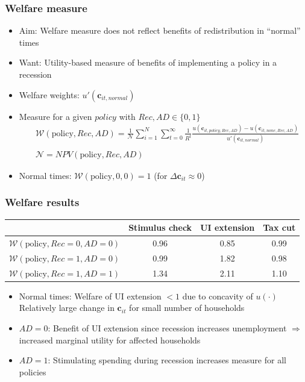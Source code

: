 \documentclass[pdflatex,aspectratio=169, handout]{beamer}
\begin{document}
\begin{frame}
\frametitle{Welfare measure}
\begin{itemize}[<+->]
\item Aim: Welfare measure does not reflect benefits of redistribution in ``normal'' times
\item Want: Utility-based measure of benefits of implementing a policy in a recession
\item Welfare weights: $u'(\mathbf{c}_{it,\textit{normal}})$
\item Measure for a given $policy$ with $Rec,AD\in\{0,1\}$
\begin{align*}
& \mathcal{W}(\text{policy},Rec,AD) =\frac{1}{\mathcal{N}} \sum_{i=1}^{N} \sum_{t=0}^{\infty} \frac{1}{R^t} \frac{u(\mathbf{c}_{it,\textit{policy},Rec,AD}) - u(\mathbf{c}_{it,\textit{none},Rec,AD})}{ u'(\mathbf{c}_{it,\textit{normal}})} \\ \\ 
& \mathcal{N} = NPV(\text{policy},Rec,AD)
\end{align*}
\item Normal times: $\mathcal{W}(\text{policy},0,0) = 1$ (for $\Delta \mathbf{c}_{it}\approx 0$)
\end{itemize}
\end{frame}

\begin{frame}
	\frametitle{Welfare results}
	\centering 
	\begin{tabular}{@{}lccc@{}} 
		\toprule 
		& Stimulus check      & UI extension    & Tax cut    \\  \midrule 
		$\mathcal{W}(\text{policy}, Rec=0, AD=0)$ & 0.96  & 0.85  & 0.99     \\ 
		$\mathcal{W}(\text{policy}, Rec=1, AD=0)$ & 0.99  & 1.82  & 0.98     \\ 
		$\mathcal{W}(\text{policy}, Rec=1, AD=1)$ & 1.34  & 2.11  & 1.10     \\ \bottomrule
	\end{tabular} 
		\medskip
\begin{itemize}[<+->]
  \itemsep = .75\bigskipamount 
\item Normal times: Welfare of UI extension $< 1$ due to concavity of $u(\cdot)$ \\[1ex] 
Relatively large change in $\mathbf{c}_{it}$ for small number of households 
\item $AD=0$: Benefit of UI extension since recession increases unemployment $\Rightarrow$ increased marginal utility for affected households 
\item $AD=1$: Stimulating spending during recession increases measure for all policies 
\end{itemize}
\end{frame}
\end{document}
